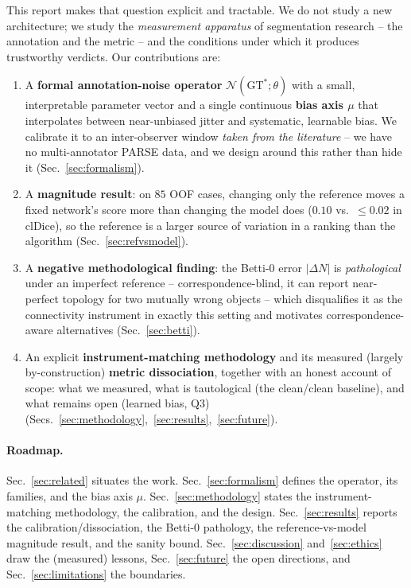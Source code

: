 \documentclass[
    bookmarks, bookmarksnumbered, bookmarksopen,
    colorlinks=true, citecolor=blue, linkcolor=blue, urlcolor=blue
]{techrep}
\newcommand{\gtstar}{\ensuremath{\mathrm{GT}^{\!*}}}
\newcommand{\Nop}{\ensuremath{\mathcal{N}}}
\begin{document}
This report makes that question explicit and tractable. We do not study a new
architecture; we study the \emph{measurement apparatus} of segmentation research --
the annotation and the metric -- and the conditions under which it produces
trustworthy verdicts. Our contributions are:
\begin{enumerate}[leftmargin=1.4em,itemsep=2pt]
  \item A \textbf{formal annotation-noise operator} $\Nop(\gtstar;\theta)$ with a small,
  interpretable parameter vector and a single continuous \textbf{bias axis $\mu$} that
  interpolates between near-unbiased jitter and systematic, learnable bias. We calibrate it to
  an inter-observer window \emph{taken from the literature} -- we have no multi-annotator PARSE
  data, and we design around this rather than hide it (Sec.~\ref{sec:formalism}).
  \item A \textbf{magnitude result}: on $85$ OOF cases, changing only the reference moves a
  fixed network's score more than changing the model does ($0.10$ vs.\ $\le0.02$ in clDice), so
  the reference is a larger source of variation in a ranking than the algorithm
  (Sec.~\ref{sec:refvsmodel}).
  \item A \textbf{negative methodological finding}: the Betti-$0$ error $|\Delta N|$ is
  \emph{pathological} under an imperfect reference -- correspondence-blind, it can report
  near-perfect topology for two mutually wrong objects -- which disqualifies it as the
  connectivity instrument in exactly this setting and motivates correspondence-aware
  alternatives (Sec.~\ref{sec:betti}).
  \item An explicit \textbf{instrument-matching methodology} and its measured (largely
  by-construction) \textbf{metric dissociation}, together with an honest account of scope: what
  we measured, what is tautological (the clean/clean baseline), and what remains open (learned
  bias, Q3) (Secs.~\ref{sec:methodology},~\ref{sec:results},~\ref{sec:future}).
\end{enumerate}

\paragraph{Roadmap.} Sec.~\ref{sec:related} situates the work. Sec.~\ref{sec:formalism} defines
the operator, its families, and the bias axis $\mu$. Sec.~\ref{sec:methodology} states the
instrument-matching methodology, the calibration, and the design. Sec.~\ref{sec:results} reports
the calibration/dissociation, the Betti-$0$ pathology, the reference-vs-model magnitude result,
and the sanity bound. Sec.~\ref{sec:discussion} and~\ref{sec:ethics} draw the (measured) lessons,
Sec.~\ref{sec:future} the open directions, and Sec.~\ref{sec:limitations} the boundaries.
\end{document}
